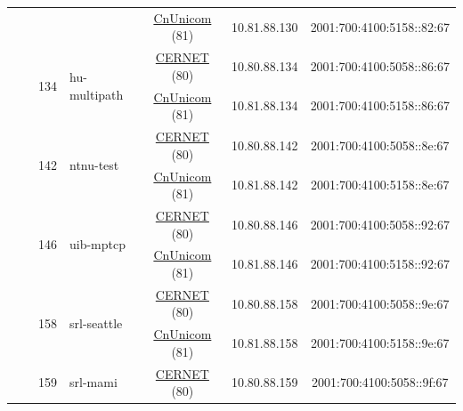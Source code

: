 \begin{small}
\begin{center}
\begin{longtable}{|c|c|c|c|c|c|c|c|}
  &  &  &  & \multicolumn{2}{|c|}{\tiny{\href{http://www.chinaunicom.com}{CnUnicom} (81)}} & \tiny{10.81.88.130} & \tiny{2001:700:4100:5158::82:67} \\* \cline{3-3}\cline{4-4}\cline{5-5}\cline{6-6}\cline{7-7}\cline{8-8}
  &  & \multirow{2}{*}{\tiny{134}} & \multicolumn{1}{|l|}{\multirow{2}{*}{\tiny{hu-multipath}}} & \multicolumn{2}{|c|}{\tiny{\href{http://www.cernet.edu.cn}{CERNET} (80)}} & \tiny{10.80.88.134} & \tiny{2001:700:4100:5058::86:67} \\* \cline{5-5}\cline{6-6}\cline{7-7}\cline{8-8}
  &  &  &  & \multicolumn{2}{|c|}{\tiny{\href{http://www.chinaunicom.com}{CnUnicom} (81)}} & \tiny{10.81.88.134} & \tiny{2001:700:4100:5158::86:67} \\* \cline{3-3}\cline{4-4}\cline{5-5}\cline{6-6}\cline{7-7}\cline{8-8}
  &  & \multirow{2}{*}{\tiny{142}} & \multicolumn{1}{|l|}{\multirow{2}{*}{\tiny{ntnu-test}}} & \multicolumn{2}{|c|}{\tiny{\href{http://www.cernet.edu.cn}{CERNET} (80)}} & \tiny{10.80.88.142} & \tiny{2001:700:4100:5058::8e:67} \\* \cline{5-5}\cline{6-6}\cline{7-7}\cline{8-8}
  &  &  &  & \multicolumn{2}{|c|}{\tiny{\href{http://www.chinaunicom.com}{CnUnicom} (81)}} & \tiny{10.81.88.142} & \tiny{2001:700:4100:5158::8e:67} \\* \cline{3-3}\cline{4-4}\cline{5-5}\cline{6-6}\cline{7-7}\cline{8-8}
  &  & \multirow{2}{*}{\tiny{146}} & \multicolumn{1}{|l|}{\multirow{2}{*}{\tiny{uib-mptcp}}} & \multicolumn{2}{|c|}{\tiny{\href{http://www.cernet.edu.cn}{CERNET} (80)}} & \tiny{10.80.88.146} & \tiny{2001:700:4100:5058::92:67} \\* \cline{5-5}\cline{6-6}\cline{7-7}\cline{8-8}
  &  &  &  & \multicolumn{2}{|c|}{\tiny{\href{http://www.chinaunicom.com}{CnUnicom} (81)}} & \tiny{10.81.88.146} & \tiny{2001:700:4100:5158::92:67} \\* \cline{3-3}\cline{4-4}\cline{5-5}\cline{6-6}\cline{7-7}\cline{8-8}
  &  & \multirow{2}{*}{\tiny{158}} & \multicolumn{1}{|l|}{\multirow{2}{*}{\tiny{srl-seattle}}} & \multicolumn{2}{|c|}{\tiny{\href{http://www.cernet.edu.cn}{CERNET} (80)}} & \tiny{10.80.88.158} & \tiny{2001:700:4100:5058::9e:67} \\* \cline{5-5}\cline{6-6}\cline{7-7}\cline{8-8}
  &  &  &  & \multicolumn{2}{|c|}{\tiny{\href{http://www.chinaunicom.com}{CnUnicom} (81)}} & \tiny{10.81.88.158} & \tiny{2001:700:4100:5158::9e:67} \\* \cline{3-3}\cline{4-4}\cline{5-5}\cline{6-6}\cline{7-7}\cline{8-8}
  &  & \multirow{2}{*}{\tiny{159}} & \multicolumn{1}{|l|}{\multirow{2}{*}{\tiny{srl-mami}}} & \multicolumn{2}{|c|}{\tiny{\href{http://www.cernet.edu.cn}{CERNET} (80)}} & \tiny{10.80.88.159} & \tiny{2001:700:4100:5058::9f:67} \\* \cline{5-5}\cline{6-6}\cline{7-7}\cline{8-8}

\end{longtable}
\end{center}
\end{small}
